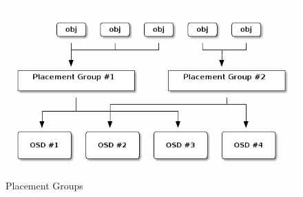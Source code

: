\documentclass{article}
\begin{document}
\begin{figure}[H]
    \centering
    \includegraphics[scale=0.5]{img/pg.jpg}
    \caption{Placement Groups}
\end{figure}\noindent
\end{document}
